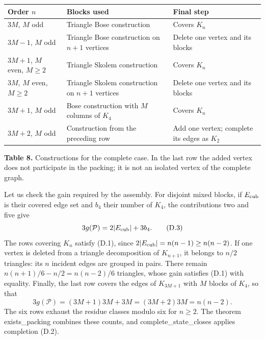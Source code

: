 \documentclass[english,11pt,a4paper]{article}
\newcounter{none}
\begin{document}
{\def\LTcaptype{none} %
\begin{longtable}[c]{@{}
  >{\raggedright\arraybackslash}p{}
  >{\raggedright\arraybackslash}p{}
  >{\raggedright\arraybackslash}p{}@{}}
\toprule\noalign{}
\begin{minipage}[b]{\linewidth}\raggedright
Order \(n\)
\end{minipage} & \begin{minipage}[b]{\linewidth}\raggedright
Blocks used
\end{minipage} & \begin{minipage}[b]{\linewidth}\raggedright
Final step
\end{minipage} \\
\midrule\noalign{}
\endhead
\bottomrule\noalign{}
\endlastfoot
\(3M\), \(M\) odd & Triangle Bose construction & Covers \(K_n\) \\
\(3M-1\), \(M\) odd & Triangle Bose construction on \(n+1\) vertices & Delete one vertex and its blocks \\
\(3M+1\), \(M\) even, \(M\ge2\) & Triangle Skolem construction & Covers \(K_n\) \\
\(3M\), \(M\) even, \(M\ge2\) & Triangle Skolem construction on \(n+1\) vertices & Delete one vertex and its blocks \\
\(3M+1\), \(M\) odd & Bose construction with \(M\) columns of \(K_4\) & Covers \(K_n\) \\
\(3M+2\), \(M\) odd & Construction from the preceding row & Add one vertex; complete its edges as \(K_2\) \\
\end{longtable}
}

\textbf{Table 8.} Constructions for the complete case. In the last row the added vertex does not participate in the packing; it is not an isolated vertex of the complete graph.

Let us check the gain required by the assembly. For disjoint mixed blocks, if \(E_{\rm cub}\) is their covered edge set and \(b_4\) their number of \(K_4\), the contributions two and five give \[
3g(\mathcal P)=2|E_{\rm cub}|+3b_4.
\tag{D.3}
\] The rows covering \(K_n\) satisfy (D.1), since \(2|E_{\rm cub}|=n(n-1)\ge n(n-2)\). If one vertex is deleted from a triangle decomposition of \(K_{n+1}\), it belongs to \(n/2\) triangles: its \(n\) incident edges are grouped in pairs. There remain \(n(n+1)/6-n/2=n(n-2)/6\) triangles, whose gain satisfies (D.1) with equality. Finally, the last row covers the edges of \(K_{3M+1}\) with \(M\) blocks of \(K_4\), so that \[
3g(\mathcal P)=(3M+1)3M+3M=(3M+2)3M=n(n-2).
\tag{D.4}
\] The six rows exhaust the residue classes modulo six for \(n\ge2\). The theorem {\ttfamily\small exists\_\discretionary{\hbox{\ensuremath{\hookrightarrow}}}{}{}packing} combines these counts, and {\ttfamily\small complete\_\discretionary{\hbox{\ensuremath{\hookrightarrow}}}{}{}state\_\discretionary{\hbox{\ensuremath{\hookrightarrow}}}{}{}closes} applies completion (D.2).
\end{document}
